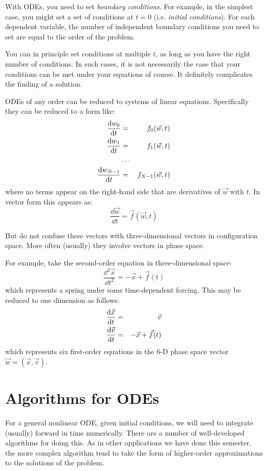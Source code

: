 With ODEs, you need to set {\it boundary conditions}. For example, in
the simplest case, you might set a set of conditions at $t=0$
(i.e. {\it initial conditions}). For each dependent variable, the
number of independent boundary conditions you need to set are equal to
the order of the problem. 

You can in principle set conditions at multiple $t$, as long as you
have the right number of conditions. In such cases, it is not
necessarily the case that your conditions can be met under your
equations of course. It definitely complicates the finding of a
solution.  

ODEs of any order can be reduced to systems of linear
equations. Specifically they can be reduced to a form like:
\begin{eqnarray}
\frac{{\rm d}w_0}{{\rm d}t} &=& f_0(\vec{w}, t) \cr
\frac{{\rm d}w_1}{{\rm d}t} &=& f_1(\vec{w}, t) \cr
&\ldots& \cr
\frac{{\rm d}w_{N-1}}{{\rm d}t} &=& f_{N-1}(\vec{w}, t)
\end{eqnarray}
where no terms appear on the right-hand side that are derivatives of
$\vec{w}$ with $t$.  In vector form this appears as:
\begin{equation}
\frac{\dd{\vec{w}}}{\dd{t}} = \vec{f}(\vec{w}, t)
\end{equation}

But do not confuse these vectors with three-dimensional vectors in
configuration space. More often (usually) they involve vectors in
phase space.

For example, take the second-order equation in three-dimensional space:
\begin{equation}
\frac{\dd{^2\vec{x}}}{\dd{t}^2} = - \vec{x} + \vec{f}(t)
\end{equation}
which represents a spring under some time-dependent forcing. This may
be reduced to one dimension as follows:
\begin{eqnarray}
\frac{{\rm d}\vec{x}}{{\rm d}t} &=& \vec{v} \cr
\frac{{\rm d}\vec{v}}{{\rm d}t} &=& - \vec{x} + \vec{f}(t) \cr
\end{eqnarray}
which represents six first-order equations in the 6-D phase space
vector $\vec{w} = (\vec{x}, \vec{v})$.

\section{Algorithms for ODEs}

For a general nonlinear ODE, given initial conditions, we will need to
integrate (usually) forward in time numerically. There are a number of
well-developed algorithms for doing this. As in other applications we
have done this semester, the more complex algorithm tend to take the
form of higher-order approximations to the solutions of the problem. 

